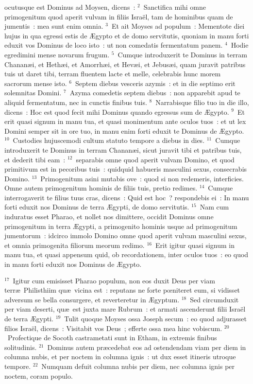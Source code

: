 \bchapter
{}ocutusque est Dominus ad Moysen, dicens~:
${}^{2}$~Sanctifica mihi omne primogenitum quod aperit vulvam in filiis Isra\"el, tam de hominibus quam de jumentis~: mea sunt enim omnia.
${}^{3}$~Et ait Moyses ad populum~: Mementote diei hujus in qua egressi estis de \AE gypto et de domo servitutis, quoniam in manu forti eduxit vos Dominus de loco isto~: ut non comedatis fermentatum panem.
${}^{4}$~Hodie egredimini mense novarum frugum.
${}^{5}$~Cumque introduxerit te Dominus in terram Chanan\ae i, et Heth\ae i, et Amorrh\ae i, et Hev\ae i, et Jebus\ae i, quam juravit patribus tuis ut daret tibi, terram fluentem lacte et melle, celebrabis hunc morem sacrorum mense isto.
${}^{6}$~Septem diebus vesceris azymis~: et in die septimo erit solemnitas Domini.
${}^{7}$~Azyma comedetis septem diebus~: non apparebit apud te aliquid fermentatum, nec in cunctis finibus tuis.
${}^{8}$~Narrabisque filio tuo in die illo, dicens~: Hoc est quod fecit mihi Dominus quando egressus sum de \AE gypto.
${}^{9}$~Et erit quasi signum in manu tua, et quasi monimentum ante oculos tuos~: et ut lex Domini semper sit in ore tuo, in manu enim forti eduxit te Dominus de \AE gypto.
${}^{10}$~Custodies hujuscemodi cultum statuto tempore a diebus in dies.
${}^{11}$~Cumque introduxerit te Dominus in terram Chanan\ae i, sicut juravit tibi et patribus tuis, et dederit tibi eam~:
${}^{12}$~separabis omne quod aperit vulvam Domino, et quod primitivum est in pecoribus tuis~: quidquid habueris masculini sexus, consecrabis Domino.
${}^{13}$~Primogenitum asini mutabis ove~: quod si non redemeris, interficies. Omne autem primogenitum hominis de filiis tuis, pretio redimes.
${}^{14}$~Cumque interrogaverit te filius tuus cras, dicens~: Quid est hoc~? respondebis ei~: In manu forti eduxit nos Dominus de terra \AE gypti, de domo servitutis.
${}^{15}$~Nam cum induratus esset Pharao, et nollet nos dimittere, occidit Dominus omne primogenitum in terra \AE gypti, a primogenito hominis usque ad primogenitum jumentorum~: idcirco immolo Domino omne quod aperit vulvam masculini sexus, et omnia primogenita filiorum meorum redimo.
${}^{16}$~Erit igitur quasi signum in manu tua, et quasi appensum quid, ob recordationem, inter oculos tuos~: eo quod in manu forti eduxit nos Dominus de \AE gypto.


${}^{17}$~Igitur cum emisisset Pharao populum, non eos duxit Deus per viam terr\ae\ Philisthiim qu\ae\ vicina est~: reputans ne forte pœniteret eum, si vidisset adversum se bella consurgere, et reverteretur in \AE gyptum.
${}^{18}$~Sed circumduxit per viam deserti, qu\ae\ est juxta mare Rubrum~: et armati ascenderunt filii Isra\"el de terra \AE gypti.
${}^{19}$~Tulit quoque Moyses ossa Joseph secum~: eo quod adjurasset filios Isra\"el, dicens~: Visitabit vos Deus~; efferte ossa mea hinc vobiscum.
${}^{20}$~Profectique de Socoth castrametati sunt in Etham, in extremis finibus solitudinis.
${}^{21}$~Dominus autem pr\ae cedebat eos ad ostendendam viam per diem in columna nubis, et per noctem in columna ignis~: ut dux esset itineris utroque tempore.
${}^{22}$~Numquam defuit columna nubis per diem, nec columna ignis per noctem, coram populo.

